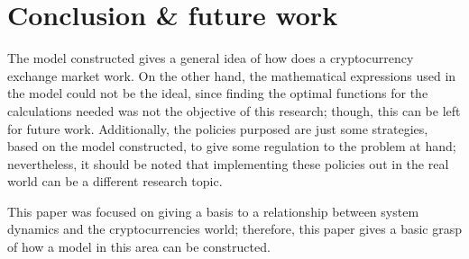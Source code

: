 \section{Conclusion \& future work}
The model constructed gives a general idea of how does a cryptocurrency exchange market work. On the other hand, the mathematical expressions used in the model could not be the ideal, since finding the optimal functions for the calculations needed was not the objective of this research; though, this can be left for future work. Additionally, the policies purposed are just some strategies, based on the model constructed, to give some regulation to the problem at hand; nevertheless, it should be noted that implementing these policies out in the real world can be a different research topic.

This paper was focused on giving a basis to a relationship between system dynamics and the cryptocurrencies world; therefore, this paper gives a basic grasp of how a model in this area can be constructed.